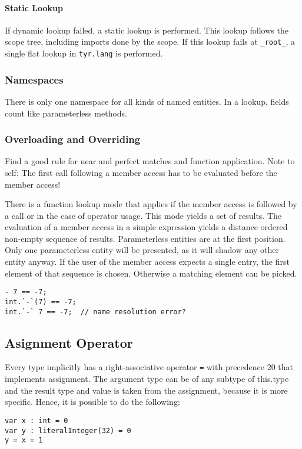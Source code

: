 \paragraph{Static Lookup} If dynamic lookup failed, a static lookup is performed.
This lookup follows the scope tree, including imports done by the scope.
If this lookup fails at \texttt{\_root\_}, a single flat lookup in \texttt{tyr.lang} is performed.


\subsubsection{Namespaces}

There is only one namespace for all kinds of named entities.
In a lookup, fields count like parameterless methods.


\subsubsection{Overloading and Overriding}

Find a good rule for near and perfect matches and function application.
Note to self: The first call following a member access has to be evaluated before the member access!

There is a function lookup mode that applies if the member access is followed by a call or in the case of operator usage.
This mode yields a set of results. 
The evaluation of a member access in a simple expression yields a distance ordered non-empty sequence of results.
Parameterless entities are at the first position.
Only one parameterless entity will be presented, as it will shadow any other entity anyway.
If the user of the member access expects a single entry, the first element of that sequence is chosen.
Otherwise a matching element can be picked.



\begin{lstlisting}[language=tyr]
- 7 == -7;
int.`-`(7) == -7;
int.`-` 7 == -7;  // name resolution error?
\end{lstlisting}

\subsection{Asignment Operator}

Every type implicitly has a right-associative operator \texttt{=} with precedence 20 that implements assignment.
The argument type can be of any subtype of this.type and the result type and value is taken from the assignment, because it is more specific.
Hence, it is possible to do the following:
\begin{lstlisting}[language=tyr]
var x : int = 0
var y : literalInteger(32) = 0
y = x = 1
\end{lstlisting}

